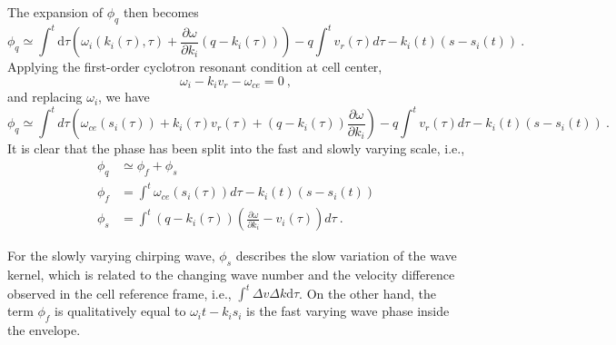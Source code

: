 The expansion of $\phi_q$ then becomes
\begin{equation}
    \phi_{q} \simeq \int^{t}\mathrm{d} \tau  \left(\omega_{i}\left(k_{i}(\tau), \tau\right) + \frac{\partial \omega}{\partial k_{i}}\left(q-k_{i}(\tau)\right) \right) -  q \int^t v_r(\tau) d \tau  - k_{i}(t)\left(s-s_{i}(t)\right)~.
\end{equation}
Applying the first-order cyclotron resonant condition at cell center,
\begin{equation}
    \omega_i - k_i v_r - \omega_{ce} = 0~,
\end{equation}
and replacing $\omega_i$, we have
\begin{equation}
        \phi_q \simeq \int^{t}  d \tau \left( \omega_{c e}\left(s_{i}(\tau)\right)+ k_i(\tau) v_r(\tau)  + \left(q-k_{i}(\tau)\right)\frac{\partial \omega}{\partial k_{i}} \right) - q \int^t v_r(\tau) d \tau - k_{i}(t)\left(s-s_{i}(t)\right)~.
\end{equation}
It is clear that the phase has been split into the fast and slowly varying scale, i.e.,
\begin{equation}\label{eq.phi_fs}
    \begin{aligned}
        \phi_q & \simeq \phi_{f} + \phi_{s}
        \\
        \phi_f & = \int^{t} \omega_{ce} \left(s_{i}(\tau)\right) d \tau -k_{i}(t)\left(s-s_{i}(t)\right)
        \\
        \phi_s & = \int^{t}\left(q-k_{i}(\tau)\right)\left(\frac{\partial \omega}{\partial k_{i}}-v_{i}(\tau)\right) d \tau~.
    \end{aligned}
\end{equation}

For the slowly varying chirping wave, $\phi_s$ describes the slow variation of the wave kernel, which is related to the changing wave number and the velocity difference observed in the cell reference frame, i.e., $\int^t\Delta v \Delta k \mathrm{d} \tau$.
On the other hand, the term $\phi_f$ is qualitatively equal to $\omega_i t - k_i s_i$ is the fast varying wave phase inside the envelope.

